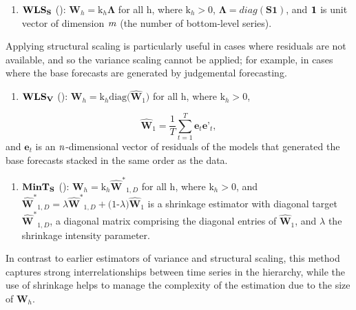 \documentclass[
  11pt,
  a4paper,
]{article}
\providecommand{\tightlist}{%
  \setlength{\itemsep}{0pt}\setlength{\parskip}{0pt}}\usepackage{longtable,booktabs,array}
\begin{document}
\begin{enumerate}
\def\labelenumi{\arabic{enumi}.}
\setcounter{enumi}{1}
\tightlist
\item
  \(\bf{WLS}_{S}\) (\textcite{athanasopoulos2017forecasting}):
  \(\mathbf{W}_{h} = \text{k}_{h}\mathbf{\Lambda}\) for all h, where
  \(\text{k}_{h} > 0\), \(\mathbf{\Lambda} = diag(\textbf{S1})\), and
  \(\bf{1}\) is unit vector of dimension \(\it{m}\) (the number of
  bottom-level series).
\end{enumerate}

Applying structural scaling is particularly useful in cases where
residuals are not available, and so the variance scaling cannot be
applied; for example, in cases where the base forecasts are generated by
judgemental forecasting.

\begin{enumerate}
\def\labelenumi{\arabic{enumi}.}
\setcounter{enumi}{2}
\tightlist
\item
  \(\bf{WLS}_{V}\) (\textcite{hyndman2016fast}):
  \(\mathbf{W}_{h} = \text{k}_{h}\text{diag(}\mathbf{\hat{W}}_{1}\text{)}\)
  for all h, where \(\text{k}_{h} > 0\),
\end{enumerate}

\[
\mathbf{\hat{W}}_{1} = \frac{1}{T}\sum_{t=1}^{T}\textbf{e}_{t}\textbf{e'}_{t},
\] and \(\textbf{e}_{t}\) is an \(\it{n}\)-dimensional vector of
residuals of the models that generated the base forecasts stacked in the
same order as the data.

\begin{enumerate}
\def\labelenumi{\arabic{enumi}.}
\setcounter{enumi}{3}
\tightlist
\item
  \(\bf{MinT}_{S}\) (\textcite{wickramasuriya2018optimal}):
  \(\mathbf{W}_{h} = \text{k}_{h}\mathbf{\hat{W}^{*}}_{1, D}\) for all
  h, where \(\text{k}_{h} > 0\), and
  \(\mathbf{\hat{W}^{*}}_{1, D} = \mathit{\lambda}\mathbf{\hat{W}^{*}}_{1, D} + \text{(1-} \mathit{\lambda})\mathbf{\hat{W}}_{1}\)
  is a shrinkage estimator with diagonal target
  \(\mathbf{\hat{W}^{*}}_{1, D}\), a diagonal matrix comprising the
  diagonal entries of \(\mathbf{\hat{W}}_{1}\), and \(\mathit{\lambda}\)
  the shrinkage intensity parameter.
\end{enumerate}

In contrast to earlier estimators of variance and structural scaling,
this method captures strong interrelationships between time series in
the hierarchy, while the use of shrinkage helps to manage the complexity
of the estimation due to the size of \(\mathbf{W}_{h}\).
\end{document}
